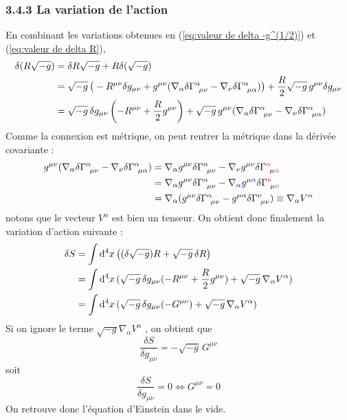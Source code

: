 \subsubsection{3.4.3 La variation de l'action}
En combinant les variations obtenues en (\ref{eq:valeur de delta -g^(1/2)}) et (\ref{eq:valeur de delta R}),
\begin{align}
    \delta(R\sqrt{-g}) &= \delta R\sqrt{-g} + R\delta(\sqrt{-g})\\
    &= \sqrt{-g}\, \big( -R^{\mu \nu}\delta g_{\mu \nu} + g^{\mu \nu}(\nabla_{\alpha}\delta\Gamma\indices{^{\alpha}_{\!\mu \nu}} - \nabla_{\nu} \delta \Gamma\indices{^{\alpha}_{\!\mu \alpha}}) \big) +\frac{R}{2}\sqrt{-g}\,g^{\mu \nu}\delta g_{\mu \nu}\\
    &= \sqrt{-g} \, \delta g_{\mu \nu} \lt -R^{\mu \nu} + \frac{R}{2}g^{\mu \nu} \rt + \sqrt{-g} \, g^{\mu \nu}(\nabla_{\alpha}\delta\Gamma\indices{^{\alpha}_{\!\mu \nu}} - \nabla_{\nu} \delta \Gamma\indices{^{\alpha}_{\!\mu \alpha}})
    \label{eq:valeur delta(R(-g)^1/2)}
\end{align}
Comme la connexion est métrique, on peut rentrer la métrique dans la dérivée covariante :
\begin{align}
    g^{\mu \nu}(\nabla_{\alpha}\delta\Gamma\indices{^{\alpha}_{\!\mu \nu}} - \nabla_{\nu} \delta \Gamma\indices{^{\alpha}_{\!\mu \alpha}}) &= \nabla_{\alpha} g^{\mu \nu} \delta\Gamma\indices{^{\alpha}_{\!\mu \nu}} - \nabla_{\textcolor{blue}{\nu}} g^{\mu \textcolor{blue}{\nu}} \delta \Gamma\indices{^{\textcolor{red}{\alpha}}_{\!\mu \textcolor{red}{\alpha}}}\\
    &= \nabla_{\alpha} g^{\mu \nu} \delta\Gamma\indices{^{\alpha}_{\!\mu \nu}} - \nabla_{\textcolor{blue}{\alpha}} g^{\mu \textcolor{blue}{\alpha}} \delta \Gamma\indices{^{\textcolor{red}{\nu}}_{\!\mu \textcolor{red}{\nu}}}\\
    &= \nabla_{\alpha}(g^{\mu \nu} \delta\Gamma\indices{^{\alpha}_{\!\mu \nu}} - g^{\mu \alpha} \delta \Gamma\indices{^{\nu}_{\!\mu \nu}}) \equiv \nabla_{\alpha} V^{\alpha}
\end{align}
notons que le vecteur $V^\alpha$ est bien un tenseur. On obtient donc finalement la variation d'action suivante :
\begin{align}
    \delta S &= \int \mathrm{d} ^4x\, \big((\delta \sqrt{-g})R + \sqrt{-g}\,\delta R \big)\\
    &= \int \mathrm{d} ^4x \, (\sqrt{-g}\,\delta g_{\mu \nu}( -R^{\mu \nu} +\frac{R}{2}g^{\mu \nu}) + \sqrt{-g}\,\nabla_{\alpha} V^{\alpha})\\
    &= \int \mathrm{d} ^4x \, (\sqrt{-g}\,\delta g_{\mu \nu}( -G^{\mu \nu})+ \sqrt{-g}\,\nabla_{\alpha} V^{\alpha})
\end{align}
Si on ignore le terme $\sqrt{-g}\nabla_{\alpha} V^{\alpha}$ , on obtient que 
\begin{equation}
    \frac{\delta S}{\delta g_{\mu \nu}} = -\sqrt{-g} \, G^{\mu \nu}
\end{equation}
soit
\begin{equation}
    \frac{\delta S}{\delta g_{\mu \nu}} = 0 \iff G^{\mu \nu} = 0
\end{equation}
On retrouve donc l'équation d'Einstein dans le vide.
